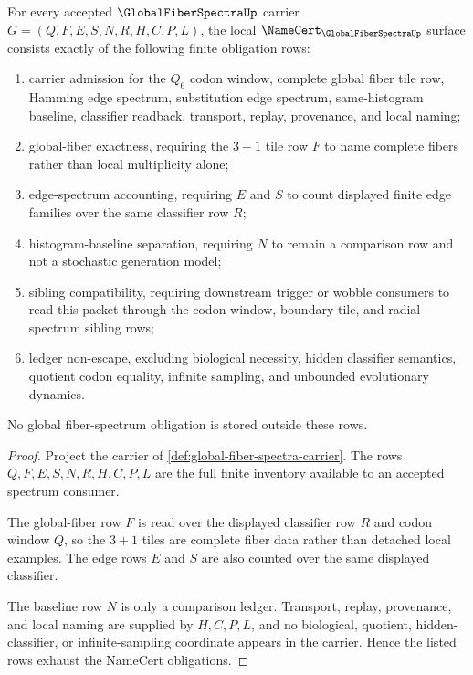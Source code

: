 \begin{theorem}
\label{thm:global-fiber-spectra-namecert-obligations}
For every accepted $\GlobalFiberSpectraUp$ carrier $G=(Q,F,E,S,N,R,H,C,P,L)$, the local $\NameCert_{\GlobalFiberSpectraUp}$ surface consists exactly of the following finite obligation rows:
\begin{enumerate}
\item carrier admission for the $Q_{6}$ codon window, complete global fiber tile row, Hamming edge spectrum, substitution edge spectrum, same-histogram baseline, classifier readback, transport, replay, provenance, and local naming;
\item global-fiber exactness, requiring the $3+1$ tile row $F$ to name complete fibers rather than local multiplicity alone;
\item edge-spectrum accounting, requiring $E$ and $S$ to count displayed finite edge families over the same classifier row $R$;
\item histogram-baseline separation, requiring $N$ to remain a comparison row and not a stochastic generation model;
\item sibling compatibility, requiring downstream trigger or wobble consumers to read this packet through the codon-window, boundary-tile, and radial-spectrum sibling rows;
\item ledger non-escape, excluding biological necessity, hidden classifier semantics, quotient codon equality, infinite sampling, and unbounded evolutionary dynamics.
\end{enumerate}
No global fiber-spectrum obligation is stored outside these rows.
\end{theorem}
\begin{proof}
Project the carrier of \autoref{def:global-fiber-spectra-carrier}. The rows $Q,F,E,S,N,R,H,C,P,L$ are the full finite inventory available to an accepted spectrum consumer.

The global-fiber row $F$ is read over the displayed classifier row $R$ and codon window $Q$, so the $3+1$ tiles are complete fiber data rather than detached local examples. The edge rows $E$ and $S$ are also counted over the same displayed classifier.

The baseline row $N$ is only a comparison ledger. Transport, replay, provenance, and local naming are supplied by $H,C,P,L$, and no biological, quotient, hidden-classifier, or infinite-sampling coordinate appears in the carrier. Hence the listed rows exhaust the NameCert obligations.
\end{proof}

